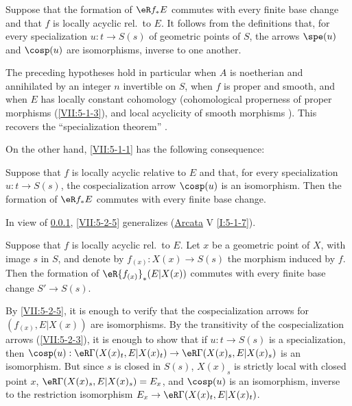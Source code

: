 \subsubsection{}\label{VII:5-2-4}

Suppose that the formation of $\eR f_\ast E$ commutes with every finite base
change and that $f$ is locally acyclic rel.\ to $E$. It follows from the
definitions that, for every specialization $u:t\to S(s)$ of geometric points
of $S$, the arrows $\spe(u)$ and $\cosp(u)$ are isomorphisms, inverse to one
another.

The preceding hypotheses hold in particular when $A$ is noetherian and
annihilated by an integer $n$ invertible on $S$, when $f$ is proper and smooth,
and when $E$ has locally constant cohomology (cohomological properness of
proper morphisms (\ref{VII:5-1-3}), and local acyclicity of smooth morphisms
). This recovers the ``specialization theorem''
.

On the other hand, \ref{VII:5-1-1} has the following consequence:






\begin{proposition}\label{VII:5-2-5}
Suppose that $f$ is locally acyclic relative to $E$ and that, for every
specialization $u:t\to S(s)$, the cospecialization arrow $\cosp(u)$ is an
isomorphism. Then the formation of $\eR f_\ast E$ commutes with every finite
base change.
\end{proposition}

In view of \ref{VII:5-2-4}, \ref{VII:5-2-5} generalizes
(\hyperref[I]{Arcata} V \ref{I:5-1-7}).






\begin{corollary}\label{VII:5-2-6}
Suppose that $f$ is locally acyclic rel.\ to $E$. Let $x$ be a geometric
point of $X$, with image $s$ in $S$, and denote by
$f_{(x)}:X(x)\to S(s)$ the morphism induced by $f$. Then the formation of
$\eR {f_{(x)}}_\ast(E|X(x))$ commutes with every finite base change
$S'\to S(s)$.
\end{corollary}

By \ref{VII:5-2-5}, it is enough to verify that the cospecialization arrows
for $(f_{(x)},E|X(x))$ are isomorphisms. By the transitivity of the
cospecialization arrows (\ref{VII:5-2-3}), it is enough to show that if
$u:t\to S(s)$ is a specialization, then
$\cosp(u):\eR\Gamma(X(x)_t,E|X(x)_t)\to \eR\Gamma(X(x)_s,E|X(x)_s)$ is an
isomorphism. But since $s$ is closed in $S(s)$, $X(x)_s$ is strictly local
with closed point $x$, $\eR\Gamma(X(x)_s,E|X(x)_s)=E_x$, and $\cosp(u)$ is an
isomorphism, inverse to the restriction isomorphism
$E_x\to \eR\Gamma(X(x)_t,E|X(x)_t)$.






